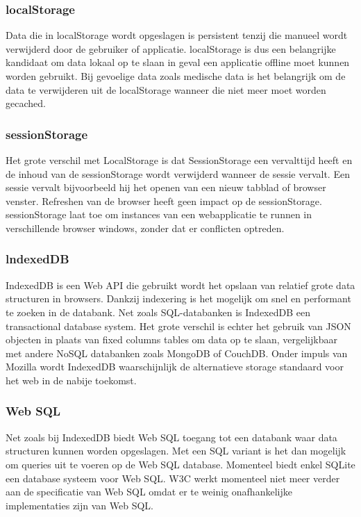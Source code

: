 \subsubsection{localStorage}
Data die in localStorage wordt opgeslagen is persistent tenzij die manueel wordt verwijderd door de gebruiker of applicatie. localStorage is dus een belangrijke kandidaat om data lokaal op te slaan in geval een applicatie offline moet kunnen worden gebruikt. Bij gevoelige data zoals medische data is het belangrijk om de data te verwijderen uit de localStorage wanneer die niet meer moet worden gecached.
\subsubsection{sessionStorage}
Het grote verschil met LocalStorage is dat SessionStorage een vervalttijd heeft en de inhoud van de sessionStorage wordt verwijderd wanneer de sessie vervalt. Een sessie vervalt bijvoorbeeld hij het openen van een nieuw tabblad of browser venster. Refreshen van de browser heeft geen impact op de sessionStorage. sessionStorage laat toe om instances van een webapplicatie te runnen in verschillende browser windows, zonder dat er conflicten optreden.
\subsubsection{lndexedDB}
IndexedDB is een Web API die gebruikt wordt het opslaan van relatief grote data structuren in browsers. Dankzij indexering is het mogelijk om snel en performant te zoeken in de databank. Net zoals SQL-databanken is IndexedDB een transactional database system. Het grote verschil is echter het gebruik van JSON objecten in plaats van fixed columns tables om data op te slaan, vergelijkbaar met andere NoSQL databanken zoals MongoDB of CouchDB. Onder impuls van Mozilla wordt IndexedDB waarschijnlijk de alternatieve storage standaard voor het web in de nabije toekomst.
\subsubsection{Web SQL}
Net zoals bij IndexedDB biedt Web SQL toegang tot een databank waar data structuren kunnen worden opgeslagen. Met een SQL variant is het dan mogelijk om queries uit te voeren op de Web SQL database. Momenteel biedt enkel SQLite een database systeem voor Web SQL. W3C werkt momenteel niet meer verder aan de specificatie van Web SQL omdat er te weinig onafhankelijke implementaties zijn van Web SQL. 
